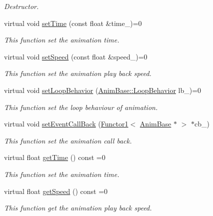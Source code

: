 \begin{DoxyCompactItemize}
\begin{DoxyCompactList}\small\item\em Destructor. \end{DoxyCompactList}\item 
virtual void \hyperlink{class_i_dream_sky_1_1_anim_base_a363398c5b1b32faa1cc2d2d34ded269b}{set\+Time} (const float \&time\+\_\+)=0
\begin{DoxyCompactList}\small\item\em This function set the animation time. \end{DoxyCompactList}\item 
virtual void \hyperlink{class_i_dream_sky_1_1_anim_base_a3df2a5e15c9008092b7c5a4b894a1348}{set\+Speed} (const float \&speed\+\_\+)=0
\begin{DoxyCompactList}\small\item\em This function set the animation play back speed. \end{DoxyCompactList}\item 
virtual void \hyperlink{class_i_dream_sky_1_1_anim_base_a6d2aacea797a49db32267341a74d7b15}{set\+Loop\+Behavior} (\hyperlink{class_i_dream_sky_1_1_anim_base_aac1c8b7253df068cf02101dcd4f586e2}{Anim\+Base\+::\+Loop\+Behavior} lb\+\_\+)=0
\begin{DoxyCompactList}\small\item\em This function set the loop behaviour of animation. \end{DoxyCompactList}\item 
virtual void \hyperlink{class_i_dream_sky_1_1_anim_base_a4e12925fe152f0a7c92a57ea0e7c5247}{set\+Event\+Call\+Back} (\hyperlink{class_i_dream_sky_1_1_functor1}{Functor1}$<$ \hyperlink{class_i_dream_sky_1_1_anim_base}{Anim\+Base} $\ast$ $>$ $\ast$cb\+\_\+)
\begin{DoxyCompactList}\small\item\em This function set the animation call back. \end{DoxyCompactList}\item 
virtual float \hyperlink{class_i_dream_sky_1_1_anim_base_a81c2529c9fa02d5ebf872b64a5bec94b}{get\+Time} () const  =0
\begin{DoxyCompactList}\small\item\em This function set the animation time. \end{DoxyCompactList}\item 
virtual float \hyperlink{class_i_dream_sky_1_1_anim_base_a1efd59d6fc483698de74097ef1bb8283}{get\+Speed} () const  =0
\begin{DoxyCompactList}\small\item\em This function get the animation play back speed. \end{DoxyCompactList}\item 

\end{DoxyCompactItemize}
